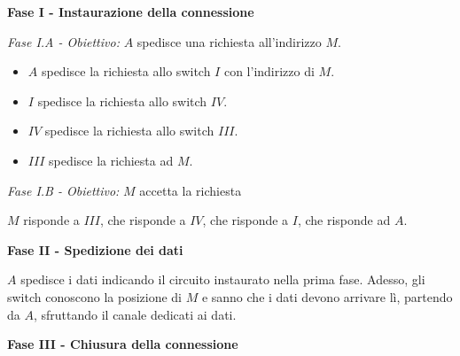             \textbf{Fase I - Instaurazione della connessione}
                
            \vspace{3mm}
                
            \textit{Fase I.A - Obiettivo:} $A$ spedisce una richiesta all'indirizzo $M$.
                
            \begin{itemize}
            
                \item
                    $A$ spedisce la richiesta allo switch $I$ con l'indirizzo di $M$.
                    
                \item
                    $I$ spedisce la richiesta allo switch $IV$.
                    
                \item
                    $IV$ spedisce la richiesta allo switch $III$.
                    
                \item
                    $III$ spedisce la richiesta ad $M$.
                    
            \end{itemize}
            
            \textit{Fase I.B - Obiettivo:} $M$ accetta la richiesta
            
            \vspace{3mm}
            
            $M$ risponde a $III$, che risponde a $IV$, che risponde a $I$, che risponde ad $A$.
            
            \vspace{3mm}
            
            \textbf{Fase II - Spedizione dei dati}
            
            \vspace{3mm}
            
            $A$ spedisce i dati indicando il circuito instaurato nella prima fase. Adesso, gli switch conoscono la posizione di $M$ e sanno che i dati devono arrivare lì, partendo da $A$, sfruttando il canale dedicati ai dati.
            
            \vspace{3mm}
            
            \textbf{Fase III - Chiusura della connessione}
            
